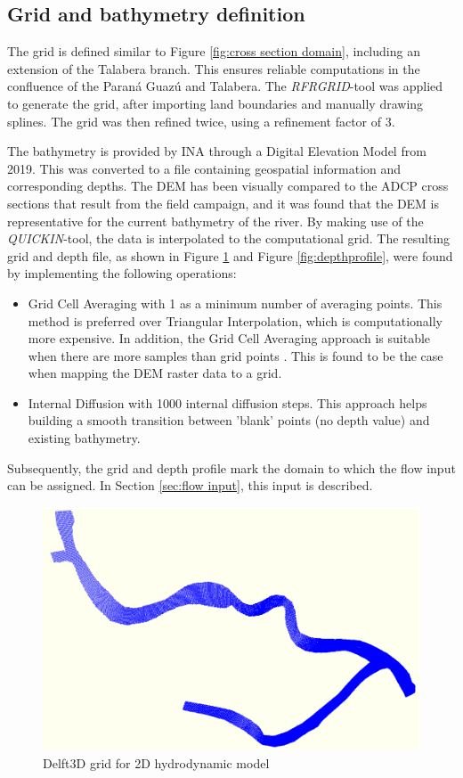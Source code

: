 \subsection{Grid and bathymetry definition}
\label{section:bathemetry}
The grid is defined similar to Figure \ref{fig:cross section domain}, including an extension of the Talabera branch. This ensures reliable computations in the confluence of the Paraná Guazú and Talabera. The \textit{RFRGRID}-tool was applied to generate the grid, after importing land boundaries and manually drawing splines. The grid was then refined twice, using a refinement factor of 3. 

The bathymetry is provided by INA through a Digital Elevation Model from 2019. This was converted to a file containing geospatial information and corresponding depths. The DEM has been visually compared to the ADCP cross sections that result from the field campaign, and it was found that the DEM is representative for the current bathymetry of the river. By making use of the \textit{QUICKIN}-tool, the data is interpolated to the computational grid. The resulting grid and depth file, as shown in Figure \ref{fig:delftgrid} and Figure \ref{fig:depthprofile}, were found by implementing the following operations:

\begin{itemize}
    \item Grid Cell Averaging with 1 as a minimum number of averaging points. This method is preferred over Triangular Interpolation, which is computationally more expensive. In addition, the Grid Cell Averaging approach is suitable when there are more samples than grid points \autocite{deltaresQUICKINUserManual2025}. This is found to be the case when mapping the DEM raster data to a grid. 
    \item Internal Diffusion with 1000 internal diffusion steps. This approach helps building a smooth transition between 'blank' points (no depth value) and existing bathymetry. 
\end{itemize}

Subsequently, the grid and depth profile mark the domain to which the flow input can be assigned. In Section \ref{sec:flow input}, this input is described. 


\begin{figure}[H]
    \centering
    \includegraphics[width=0.5\linewidth]{figures/ch7/delftgrid.PNG}
    \caption{Delft3D grid for 2D hydrodynamic model}
    \label{fig:delftgrid}
\end{figure}


